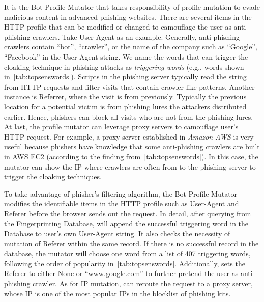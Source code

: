 It is the Bot Profile Mutator that takes responsibility of profile mutation to evade malicious content in advanced phishing websites.
There are several items in the HTTP profile that can be modified or changed to camouflage the user as anti-phishing crawlers.
Take User-Agent as an example. 
Generally, anti-phishing crawlers contain ``bot'', ``crawler'', or the name of the company such as ``Google'', ``Facebook'' in the User-Agent string.
We name the words that can trigger the cloaking technique in phishing attacks as \emph{triggering words} (e.g., words shown in~\autoref{tab:topsenswords}).
Scripts in the phishing server typically read the string from HTTP requests and filter visits that contain crawler-like patterns.
Another instance is Referrer, where the visit is from previously.
Typically the previous location for a potential victim is from phishing lures the attackers distributed earlier.
Hence, phishers can block all visits who are not from the phishing lures.
At last, the profile mutator can leverage proxy servers to camouflage user's HTTP request.
For example, a proxy server established in \emph{Amazon AWS} is very useful because phishers have knowledge that some anti-phishing crawlers are built in AWS EC2 (according to the finding from~\autoref{tab:topsenswords}).
In this case, the mutator can show the IP where crawlers are often from to the phishing server to trigger the cloaking techniques.

To take advantage of phisher's filtering algorithm, the Bot Profile Mutator modifies the identifiable items in the HTTP profile such as User-Agent and Referer before the browser sends out the request.
In detail, after querying from the Fingerprinting Database, \spartacus will append the successful triggering word in the Database to user's own User-Agent string.
It also checks the necessity of mutation of Referer within the same record.
If there is no successful record in the database,
the mutator will choose one word from a list of 407 triggering words, following the order of popularity in~\autoref{tab:topsenswords}.
Additionally, \spartacus sets the Referer to either None or ``www.google.com'' to further pretend the user as anti-phishing crawler.
As for IP mutation, \spartacus can reroute the request to a proxy server, whose IP is one of the most popular IPs in the blocklist of phishing kits.

